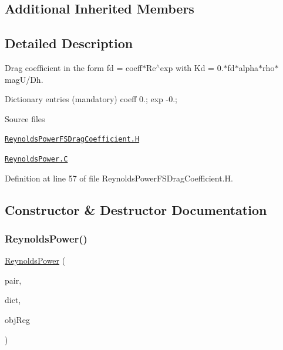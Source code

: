 \subsection*{Additional Inherited Members}


\subsection{Detailed Description}
Drag coefficient in the form fd = coeff$\ast$\+Re$^\wedge$exp with Kd = 0.$\ast$fd$\ast$alpha$\ast$rho$\ast$mag\+U/\+Dh. 

\label{_Description}%
 Dictionary entries (mandatory) coeff 0.; exp -\/0.;

\begin{DoxyParagraph}{Source files}

\begin{DoxyItemize}
\item \href{../../../home/carlo/data/GeN-Foam/GeN-Foam_ffn/GeN-Foam/GeN-Foam/classes/thermalHydraulics/src/physicsModels/dragModels/FSDragCoefficientModels/ReynoldsPower/ReynoldsPowerFSDragCoefficient.H}{\tt Reynolds\+Power\+F\+S\+Drag\+Coefficient.\+H} 
\item \href{../../../home/carlo/data/GeN-Foam/GeN-Foam_ffn/GeN-Foam/GeN-Foam/classes/thermalHydraulics/src/physicsModels/dragModels/FSDragCoefficientModels/ReynoldsPower/ReynoldsPower.C}{\tt Reynolds\+Power.\+C} 
\end{DoxyItemize}
\end{DoxyParagraph}


Definition at line 57 of file Reynolds\+Power\+F\+S\+Drag\+Coefficient.\+H.



\subsection{Constructor \& Destructor Documentation}
\mbox{\label{classFoam_1_1FSDragCoefficientModels_1_1ReynoldsPower_a8ebd8e7db76f7d2ea0aa0f218f30a959}} 
\subsubsection{\texorpdfstring{Reynolds\+Power()}{ReynoldsPower()}}
{\footnotesize\ttfamily \hyperlink{classFoam_1_1FSDragCoefficientModels_1_1ReynoldsPower}{Reynolds\+Power} (\begin{DoxyParamCaption}\item[{const \hyperlink{classFoam_1_1FSPair}{F\+S\+Pair} \&}]{pair,  }\item[{const dictionary \&}]{dict,  }\item[{const object\+Registry \&}]{obj\+Reg }\end{DoxyParamCaption})}



